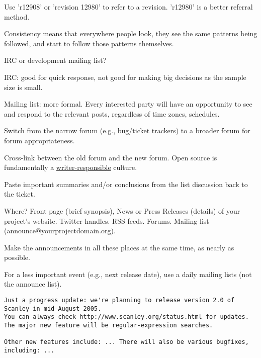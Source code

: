\documentclass[landscape,30pt]{foils}
\begin{document}
Use 'r12908' or 'revision 12980' to refer to a revision.  'r12980' is a better referral method.

Consistency means that everywhere people look, they see the same patterns being followed, and start to follow those patterns
themselves.


IRC or development mailing list?

IRC: good for quick response, not good for making big decisions as the sample size is small.

Mailing list: more formal. Every interested party will have an opportunity to see and respond
to the relevant posts, regardless of time zones, schedules.

Switch from the narrow forum (e.g., bug/ticket trackers) to a broader forum for forum appropriateness.

Cross-link between the old forum and the new forum.   Open source is fundamentally a \underline{writer-responsible} culture.

Paste important summaries and/or conclusions from the list discussion back to the ticket.


Where? Front page (brief synopsis), News or Press Releases (details) of your project's website.  Twitter handles.  RSS feeds.  Forums. Mailing list (announce@yourprojectdomain.org).

Make the announcements in all these places at the same time, as nearly as possible.

For a less important event (e.g., next release date), use a daily mailing lists (not the announce list).

{\tiny
\begin{verbatim}
Just a progress update: we're planning to release version 2.0 of Scanley in mid-August 2005. 
You can always check http://www.scanley.org/status.html for updates. 
The major new feature will be regular-expression searches.

Other new features include: ... There will also be various bugfixes, including: ...

\end{verbatim}
}


\end{document}
